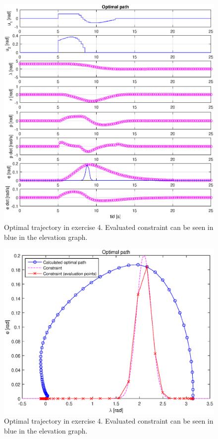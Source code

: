 \begin{figure}
    \includegraphics[width=\textwidth]{p4_trajectory.eps}
    \caption{Optimal trajectory in exercise 4. Evaluated constraint can be seen in blue in the elevation graph.}
    \label{fig:p4o}
\end{figure}

\begin{figure}
    \includegraphics[width=\textwidth]{p4_2d_path.eps}
    \caption{Optimal trajectory in exercise 4. Evaluated constraint can be seen in blue in the elevation graph.}
    \label{fig:p4o2}
\end{figure}


